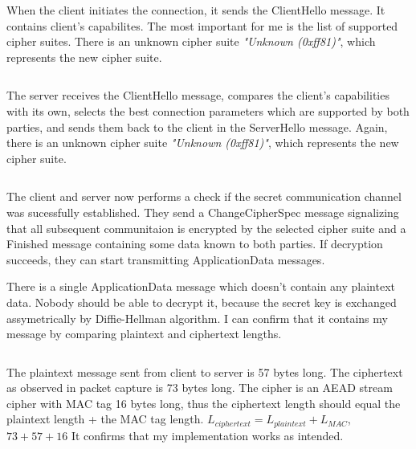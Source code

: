 When the client initiates the connection, it sends the ClientHello message. It contains client's capabilites. The most important for me is the list of supported cipher suites. There is an unknown cipher suite \textit{"Unknown (0xff81)"}, which represents the new cipher suite.

\inputminted{text}{code/packet-client-hello.txt}

The server receives the ClientHello message, compares the client's capabilities with its own, selects the best connection parameters which are supported by both parties, and sends them back to the client in the ServerHello message. Again, there is an unknown cipher suite \textit{"Unknown (0xff81)"}, which represents the new cipher suite.

\inputminted{text}{code/packet-server-hello.txt}

The client and server now performs a check if the secret communication channel was sucessfully established. They send a ChangeCipherSpec message signalizing that all subsequent communitaion is encrypted by the selected cipher suite and a Finished message containing some data known to both parties. If decryption succeeds, they can start transmitting ApplicationData messages.

There is a single ApplicationData message which doesn't contain any plaintext data. Nobody should be able to decrypt it, because the secret key is exchanged assymetrically by Diffie-Hellman algorithm. I can confirm that it contains my message by comparing plaintext and ciphertext lengths.

\inputminted{text}{code/packet-data.txt}

The plaintext message sent from client to server is 57 bytes long. The ciphertext as observed in packet capture is 73 bytes long. The cipher is an AEAD stream cipher with MAC tag 16 bytes long, thus the ciphertext length should equal the plaintext length + the MAC tag length. $L_{ciphertext} = L_{plaintext} + L_{MAC}$, $73 + 57 + 16$ It confirms that my implementation works as intended.
